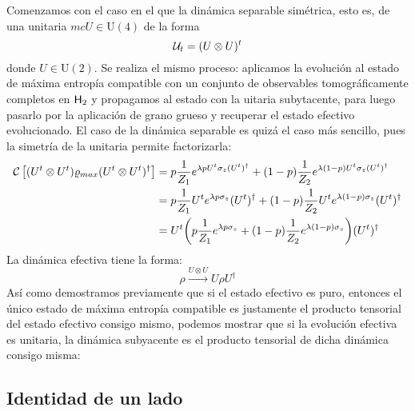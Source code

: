Comenzamos con el caso en el que la dinámica separable simétrica, esto es, de una unitaria $mcU\in\text{U}(4)$ de la forma
\begin{equation*}
    \mathcal{U}_{t}=(U \otimes U)^{t}
\end{equation*}
donde $U\in\text{U}(2)$. Se realiza el mismo proceso: aplicamos la evolución al estado de máxima entropía compatible con un conjunto de observables tomográficamente completos en ${\sf H}_{2}$ y propagamos al estado con la uitaria subytacente, para luego pasarlo por la aplicación de grano grueso y recuperar el estado efectivo evolucionado. El caso de la dinámica separable es quizá el caso más sencillo, pues la simetría de la unitaria permite factorizarla:
\begin{align*}
\mathcal{C}\left[(U^{t}\otimes U^{t})\varrho_{max}(U^{t}\otimes U^{t})^{\dag}\right]&=p\frac{1}{Z_{1}}e^{\lambda p U^{t}\sigma_{z}(U^t)^{\dag}}+(1-p)\frac{1}{Z_{2}}e^{\lambda (1-p)U^{t}\sigma_{z}(U^t)^{\dag}}\\
&=p\frac{1}{Z_{1}}U^{t}e^{\lambda p \sigma_{z}}(U^t)^{\dag}+(1-p)\frac{1}{Z_{2}}U^{t}e^{\lambda (1-p)\sigma_{z}}(U^t)^{\dag}\\
&=U^{t}\qty(p\frac{1}{Z_{1}}e^{\lambda p \sigma_{z}}+(1-p)\frac{1}{Z_{2}}e^{\lambda (1-p)\sigma_{z}})(U^t)^{\dag}\\
\end{align*}
La dinámica efectiva tiene la forma:
\begin{equation}
    \rho\xrightarrow{U\otimes U}U\rho U^{\dagger}
\end{equation}
Así como demostramos previamente que si el estado efectivo es puro, entonces el único estado de máxima entropía compatible es justamente el producto tensorial del estado efectivo consigo mismo, podemos mostrar que si la evolución efectiva es unitaria, la dinámica subyacente es el producto tensorial de dicha dinámica consigo misma:

\subsection{Identidad de un lado}

